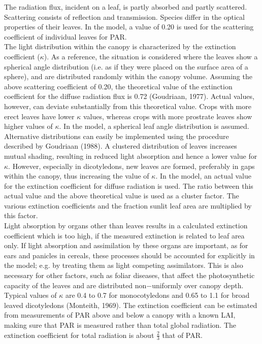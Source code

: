 The radiation flux, incident on a leaf, is partly absorbed and partly scattered. Scatter\-ing
consists of reflection and transmission. Species differ in the optical properties of their
leaves. In the model, a value of 0.20 is used for the scattering coefficient of individual 
leaves for PAR. \\
The light distribution within the canopy is characterized by the extinction coefficient ($\kappa$).
As a reference, the situation is considered where the leaves show a spherical angle
distribution (i.e. as if they were placed on the surface area of a sphere), and are distrib\-uted randomly within the canopy volume. Assuming the above scattering coefficient of
0.20, the theoretical value of the extinction coefficient for the diffuse radiation flux is
0.72 (Goudriaan, 1977). Actual values, however, can deviate substan\-tially from this
theoretical value. Crops with more erect leaves have lower $\kappa$ values, whereas crops with
more prostrate leaves show higher values of $\kappa$. In the model, a spherical leaf angle
distribution is assumed. Alternative distributions can easily be implemented using the
procedure described by Goudriaan (1988). A clustered distribution of leaves increases
mutual shading, resulting in reduced light absorption and hence a lower value for $\kappa$.
However, especially in dicotyledons, new leaves are formed, preferably in gaps within the
canopy, thus increasing the value of $\kappa$. In the model, an actual value for the extinction
coefficient for diffuse radiation is used. The ratio between this actual value and the above
theoretical value is used as a cluster factor. The various extinction coefficients and the
fraction sunlit leaf area are multiplied by this factor.\\
Light absorption by organs other than leaves results in a calculated extinction coefficient
which is too high, if the measured extinction is related to leaf area only. If light absorp\-tion and assimilation by these organs are important, as for ears and panicles in cereals,
these processes should be accounted for explicitly in the model; e.g. by treating them as
light competing assimilators. This is also necessary for other factors, such as foliar
diseases, that affect the photosynthetic capacity of the leaves and are distributed
{\nobreak}non$-$uniformly over canopy depth. \\
Typical values of $\kappa$ are 0.4 to 0.7 for monocotyledons and 0.65 to 1.1 for broad leaved
{\nobreak}dicotyledons (Monteith, 1969). The extinction coefficient can be estimated from measure\-ments of PAR above and below a canopy with a known LAI, making sure that PAR is
measured rather than total global radiation. The extinction coefficient for total radiation is
about $\frac{2}{3}$ that of PAR. 





